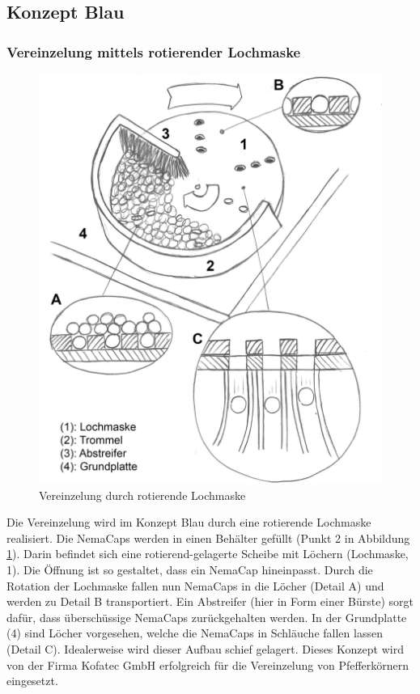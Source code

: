 \subsection{Konzept Blau}

\subsubsection{Vereinzelung mittels rotierender Lochmaske}
\begin{figure}
	\includegraphics[scale=0.52]{Illustrationen/5-Konzept/schema_vereinzelung.jpg}
	\caption{Vereinzelung durch rotierende Lochmaske}
	\label{fig:schema_vereinzelung}
\end{figure}
Die Vereinzelung wird im Konzept  Blau durch eine rotierende Lochmaske realisiert. Die NemaCaps werden in einen Behälter gefüllt (Punkt 2 in Abbildung \ref{fig:schema_vereinzelung}). Darin befindet sich eine rotierend-gelagerte Scheibe mit Löchern (Lochmaske, 1). Die Öffnung ist so gestaltet, dass ein NemaCap hineinpasst. Durch die Rotation der Lochmaske fallen nun NemaCaps in die Löcher (Detail A) und werden zu Detail B transportiert. Ein Abstreifer (hier in Form einer Bürste) sorgt dafür, dass überschüssige NemaCaps zurückgehalten werden. In der Grundplatte (4) sind Löcher vorgesehen, welche die NemaCaps in Schläuche fallen lassen (Detail C). Idealerweise wird dieser Aufbau schief gelagert. 
\newline
Dieses Konzept wird von der Firma Kofatec GmbH erfolgreich für die Vereinzelung von Pfefferkörnern eingesetzt. 

